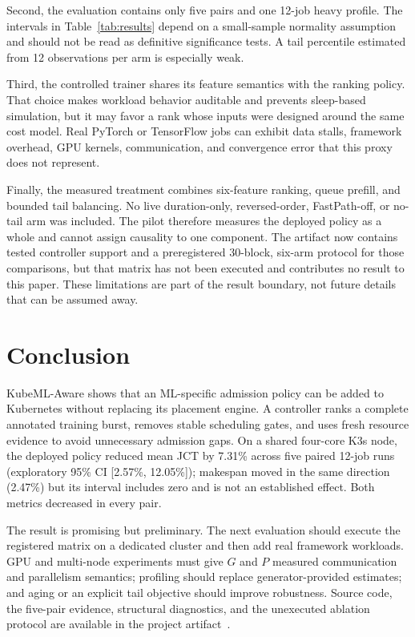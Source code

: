\documentclass[10pt,journal,compsoc]{IEEEtran}
\newcommand{\system}{KubeML-Aware}
\begin{document}
Second, the evaluation contains only five pairs and one 12-job heavy profile. The intervals in Table~\ref{tab:results} depend on a small-sample normality assumption and should not be read as definitive significance tests. A tail percentile estimated from 12 observations per arm is especially weak.

Third, the controlled trainer shares its feature semantics with the ranking policy. That choice makes workload behavior auditable and prevents sleep-based simulation, but it may favor a rank whose inputs were designed around the same cost model. Real PyTorch or TensorFlow jobs can exhibit data stalls, framework overhead, GPU kernels, communication, and convergence error that this proxy does not represent.

Finally, the measured treatment combines six-feature ranking, queue prefill, and bounded tail balancing. No live duration-only, reversed-order, FastPath-off, or no-tail arm was included. The pilot therefore measures the deployed policy as a whole and cannot assign causality to one component. The artifact now contains tested controller support and a preregistered 30-block, six-arm protocol for those comparisons, but that matrix has not been executed and contributes no result to this paper. These limitations are part of the result boundary, not future details that can be assumed away.

\section{Conclusion}

\system{} shows that an ML-specific admission policy can be added to Kubernetes without replacing its placement engine. A controller ranks a complete annotated training burst, removes stable scheduling gates, and uses fresh resource evidence to avoid unnecessary admission gaps. On a shared four-core K3s node, the deployed policy reduced mean JCT by 7.31\% across five paired 12-job runs (exploratory 95\% CI [2.57\%, 12.05\%]); makespan moved in the same direction (2.47\%) but its interval includes zero and is not an established effect. Both metrics decreased in every pair.

The result is promising but preliminary. The next evaluation should execute the registered matrix on a dedicated cluster and then add real framework workloads. GPU and multi-node experiments must give $G$ and $P$ measured communication and parallelism semantics; profiling should replace generator-provided estimates; and aging or an explicit tail objective should improve robustness. Source code, the five-pair evidence, structural diagnostics, and the unexecuted ablation protocol are available in the project artifact~\cite{kubeml2026artifact}.
\end{document}
